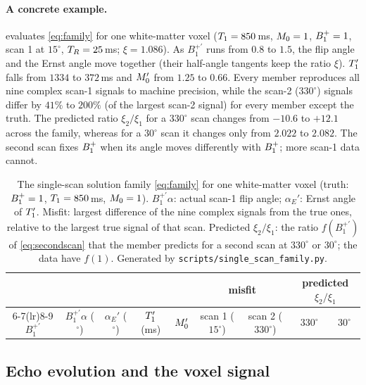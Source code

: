 \paragraph{A concrete example.}  evaluates \eqref{eq:family} for one
white-matter voxel ($T_1=850$\,ms, $M_0=1$, $B_1^{+}=1$, scan 1 at $15^\circ$, $T_R=25$\,ms; $\xi=1.086$). As $B_1^{+\prime}$
runs from $0.8$ to $1.5$, the flip angle and the Ernst angle move together (their half-angle tangents
keep the ratio $\xi$). $T_1'$ falls from $1334$ to $372$\,ms and $M_0'$ from $1.25$ to $0.66$. Every
member reproduces all nine complex scan-1 signals to machine precision, while the scan-2
($330^\circ$) signals differ by $41\%$ to $200\%$ (of the largest scan-2 signal) for every member except
the truth. The predicted ratio $\xi_2/\xi_1$ for a $330^\circ$ scan changes from $-10.6$ to $+12.1$ across the
family, whereas for a $30^\circ$ scan it changes only from $2.022$ to $2.082$. The second scan fixes
$B_1^{+}$ when its angle moves differently with $B_1^{+}$; more scan-1 data cannot.

\begin{table}[!htbp]
\centering
\caption{The single-scan solution family \eqref{eq:family} for one white-matter voxel (truth:
$B_1^{+}=1$, $T_1=850$\,ms, $M_0=1$). $B_1^{+\prime}\alpha$: actual scan-1 flip angle; $\alpha_E'$: Ernst angle of
$T_1'$. Misfit: largest difference of the nine complex signals from the true ones, relative to
the largest true signal of that scan. Predicted $\xi_2/\xi_1$: the ratio $f(B_1^{+\prime})$ of
\eqref{eq:secondscan} that the member predicts for a second scan at $330^\circ$ or $30^\circ$; the data
have $f(1)$. Generated by \texttt{scripts/single\_scan\_family.py}.}
\label{tab:family}
\small\setlength{\tabcolsep}{4.5pt}
\begin{tabular}{ccccccccc}
\toprule
& & & & & \multicolumn{2}{c}{misfit} & \multicolumn{2}{c}{predicted $\xi_2/\xi_1$}\\
\cmidrule(lr){6-7}\cmidrule(lr){8-9}
$B_1^{+\prime}$ & $B_1^{+\prime}\alpha$ ($^\circ$) & $\alpha_E'$ ($^\circ$) & $T_1'$ (ms) & $M_0'$ & scan 1 ($15^\circ$) & scan 2 ($330^\circ$) & $330^\circ$ & $30^\circ$\\
\midrule

\bottomrule
\end{tabular}
\end{table}

\subsection{Echo evolution and the voxel signal}


